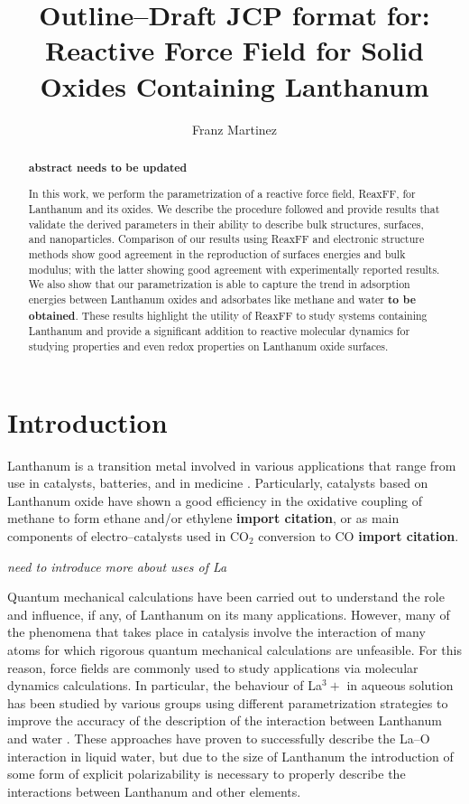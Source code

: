 \documentclass[journal=jpcafh,manuscript=article]{achemso}
\author{Franz Martinez}
\affiliation{Schulich School of Engineering, University of Calgary, Calgary, Alberta, Canada}
\title{Outline--Draft JCP format for: Reactive Force Field for Solid Oxides Containing Lanthanum}
\begin{document}
\begin{abstract}
\textbf{abstract needs to be updated}


In this work, we perform the parametrization of a reactive force field, ReaxFF, for Lanthanum and its oxides.
We describe the procedure followed and provide results that validate the derived parameters in their ability to describe bulk structures, surfaces, and nanoparticles.
Comparison of our results using ReaxFF and electronic structure methods show good agreement in the reproduction of surfaces energies and bulk modulus; with the latter showing good agreement with experimentally reported results.
We also show that our parametrization is able to capture the trend in adsorption energies between Lanthanum oxides and adsorbates like methane and water \textbf{to be obtained}.
These results highlight the utility of ReaxFF to study systems containing Lanthanum and provide a significant addition to reactive molecular dynamics for studying properties and even redox properties on Lanthanum oxide surfaces.

\end{abstract}


\section{Introduction}

Lanthanum is a transition metal involved in various applications that range from use in catalysts, batteries, and in medicine \cite{atwood2013rare,he2013preparation}.
Particularly, catalysts based on Lanthanum oxide have shown a good efficiency in the oxidative coupling of methane to form ethane and/or ethylene \textbf{import citation}, or as main components of electro--catalysts used in CO$_2$ conversion to CO \textbf{import citation}.

\emph{need to introduce more about uses of La}

Quantum mechanical calculations have been carried out to understand the role and influence, if any, of Lanthanum on its many applications.
However, many of the phenomena that takes place in catalysis involve the interaction of many atoms for which rigorous quantum mechanical calculations are unfeasible.
For this reason, force fields are commonly used to study applications via molecular dynamics calculations.
In particular, the behaviour of La$^3+$ in aqueous solution has been studied by various groups using different parametrization strategies to improve the accuracy of the description of the interaction between Lanthanum and water \cite{duvail2007pair}.
These approaches have proven to successfully describe the La--O interaction in liquid water, but due to the size of Lanthanum the introduction of some form of explicit polarizability is necessary to properly describe the interactions between Lanthanum and other elements.
\end{document}
